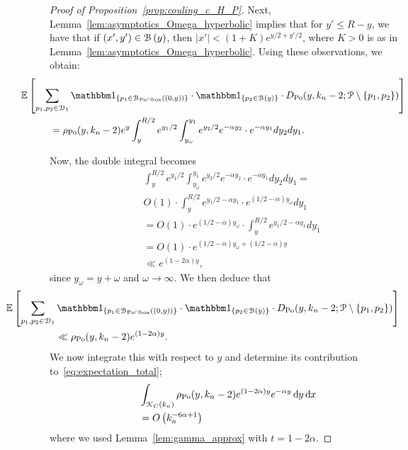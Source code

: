 \begin{proof}[Proof of Proposition~\ref{prop:couling_c_H_P}]
Next, Lemma~\ref{lem:asymptotics_Omega_hyperbolic} implies that for $y'\leq R -y$, we have that if $(x',y') \in {\mathcal B}\left(y\right)$, then $|x'| < (1+ K) e^{y/2 + y'/2}$, where $K >0$ is as in Lemma~\ref{lem:asymptotics_Omega_hyperbolic}. Using these observations, we obtain: 
\begin{align*}
	&\hspace{-30pt} \Exp{\sum_{p_1, p_2\in \dom{1}} \ind{p_1 \in \BallInter{(0,y)}} \cdot \ind{p_2 \in \BallHyp{y}} \cdot 
	D_{\Po} (y,k_n-2;\Pcal \setminus \{p_1, p_2\})} \\
	&= \rho_{\Po}(y,k_n-2)
	e^{y}\int_y^{R/2} e^{y_1/2}\int_{y_\omega}^{y_1} e^{y_2/2} e^{-\alpha y_2} \cdot e^{-\alpha y_1} dy_2 dy_1.
\end{align*}

Now, the double integral becomes
\begin{equation}
\begin{split}
& \int_y^{R/2} e^{y_1/2}\int_{y_\omega}^{y_1} e^{y_2/2} e^{-\alpha y_2} \cdot e^{-\alpha y_1} dy_2 dy_1 = \\
&  O(1) \cdot  \int_y^{R/2} e^{y_1/2 - \alpha y_1} \cdot 
e^{(1/2 - \alpha) y_\omega} dy_1 \\
& =O(1) \cdot e^{(1/2 - \alpha) y_\omega} \cdot \int_y^{R/2} e^{y_1/2 - \alpha y_1} d y_1 \\
& =O(1) \cdot e^{(1/2 - \alpha) y_\omega + (1/2 - \alpha) y} \\ 
& \ll e^{(1 - 2\alpha) y},
\end{split}
\end{equation}
since $y_\omega = y + \omega$ and $\omega \to \infty$. 
We then deduce that 
\begin{equation}
\begin{split}
&\hspace{-50pt}\Exp{\sum_{p_1, p_2\in \dom{1}} \ind{p_1 \in \BallInter{(0,y)}} \cdot \ind{p_2 \in \BallHyp{y}} \cdot 
D_{\Po} (y,k_n-2;\Pcal \setminus \{p_1, p_2\})}\\
& \ll \rho_{\Po}(y,k_n-2) e^{(1-2\alpha)y}.
\end{split}
\end{equation}
We now integrate this with respect to $y$ and determine its contribution to~\eqref{eq:expectation_total};
\begin{align*} 
	& \int_{{\mathcal K}_{C}(k_n)} \rho_{{\mathrm{Po}}}(y,k_n-2) e^{(1-2\alpha)y} e^{-\alpha y} \operatorname{\mathrm{d}\hspace{-2pt}} y \operatorname{\mathrm{d}\hspace{-2pt}} x \\
	&= O\left(k_n^{-6\alpha + 1}\right)
\end{align*}
where we used Lemma~\ref{lem:gamma_approx} with $t = 1 - 2\alpha$.


\end{proof}
